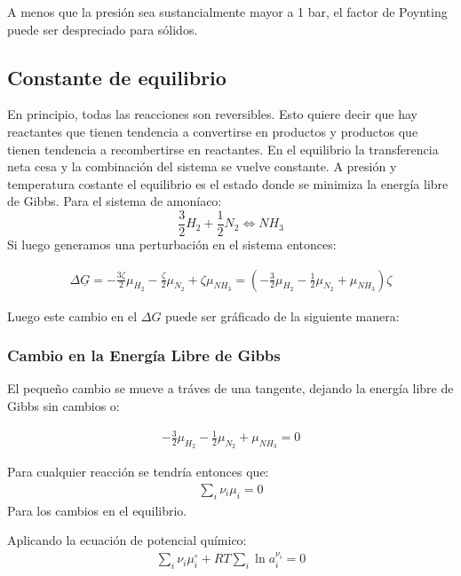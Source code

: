A menos que la presión sea sustancialmente mayor a 1 bar, el factor de Poynting puede ser despreciado para sólidos.

\subsection{Constante de equilibrio}

En principio, todas las reacciones son reversibles. Esto quiere decir que hay reactantes que tienen tendencia a convertirse en productos y productos que tienen tendencia a recombertirse en reactantes. En el equilibrio la 
transferencia neta cesa y la combinación del sistema se vuelve constante. A presión y temperatura costante el equilibrio es el estado donde se minimiza la energía libre de Gibbs.
Para el sistema de amoníaco:
\begin{equation}
    \frac{3}{2}H_2+\frac{1}{2}N_2\Leftrightarrow NH_3
\end{equation}
Si luego generamos una perturbación en el sistema entonces:

\begin{align}
    \Delta \underline{G}=-\frac{3\zeta}{2}\mu_{H_2}-\frac{\zeta}{2}\mu_{N_2}+\zeta \mu_{NH_3}=\left(-\frac{3}{2}\mu_{H_2}-\frac{1}{2}\mu_{N_2}+\mu_{NH_3}\right)\zeta
\end{align}

Luego este cambio en el $\Delta G$ puede ser gráficado de la siguiente manera:

\subsubsection{Cambio en la Energía Libre de Gibbs}

El pequeño cambio se mueve a tráves de una tangente, dejando la energía libre de Gibbs sin cambios o:

\begin{align}
    -\frac{3}{2}\mu_{H_2}-\frac{1}{2}\mu_{N_2}+\mu_{NH_3}=0
\end{align}

Para cualquier reacción se tendría entonces que:
\begin{align}
    \sum_i \nu_i \mu_i=0
\end{align}
Para los cambios en el equilibrio.

Aplicando la ecuación de potencial químico:
\begin{align}
    \sum_i \nu_i \mu_i^\circ + RT \sum_i \ln a_i^{\nu_i}=0
\end{align}

